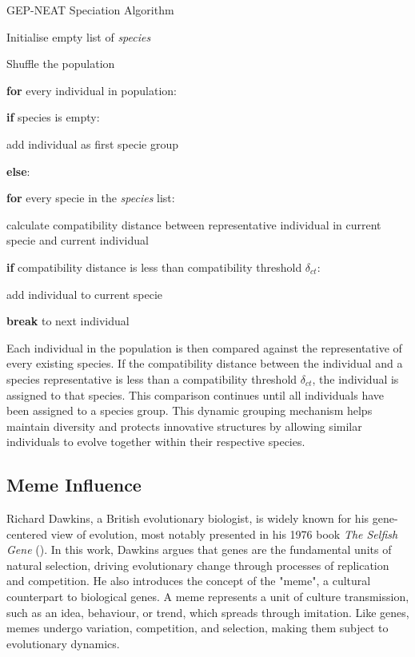 \parbreak
\begin{algorithm}[H]
	\caption{GEP-NEAT Speciation Algorithm}\label{alg:speciation_2}
	\begin{algorithmic}[1]
	\item Initialise empty list of \textit{species}
	\item Shuffle the population
	\item \textbf{for} every individual in population:
	\item \quad \textbf{if} species is empty:
	\item \quad \quad add individual as first specie group
	\item \quad \textbf{else}:
	\item \quad \quad \textbf{for} every specie in the \textit{species} list:
	\item \quad \quad \quad calculate compatibility distance between representative individual in current specie and current individual
	\item \quad \quad \quad \textbf{if} compatibility distance is less than compatibility threshold $\delta_{ct}$:
	\item \quad \quad \quad \quad add individual to current specie
	\item \quad \quad \quad \quad \textbf{break} to next individual
\end{algorithmic}
\end{algorithm}

\parbreak\noindent Each individual in the population is then compared against the representative of every existing species. If the compatibility distance between the individual and a species representative is less than a compatibility threshold $\delta_{ct}$, the individual is assigned to that species. This comparison continues until all individuals have been assigned to a species group. This dynamic grouping mechanism helps maintain diversity and protects innovative structures by allowing similar individuals to evolve together within their respective species.

\subsection{Meme Influence}
Richard Dawkins, a British evolutionary biologist, is widely known for his gene-centered view of evolution, most notably presented in his 1976 book \textit{The Selfish Gene} (\cite{dawkins1981selfish}). In this work, Dawkins argues that genes are the fundamental units of natural selection, driving evolutionary change through processes of replication and competition. He also introduces the concept of the "meme", a cultural counterpart to biological genes. A meme represents a unit of culture transmission, such as an idea, behaviour, or trend, which spreads through imitation. Like genes, memes undergo variation, competition, and selection, making them subject to evolutionary dynamics.

